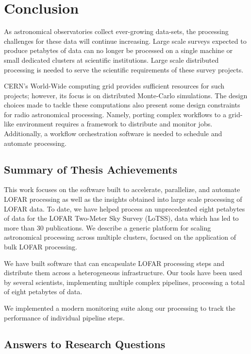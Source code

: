 \chapter{Conclusion}

\label{ch:conclusions}

As astronomical observatories collect ever-growing data-sets, the processing challenges for these data will continue increasing. Large scale surveys expected to produce petabytes of data can no longer be processed on a single machine or small dedicated clusters at scientific institutions. Large scale distributed processing is needed to serve the scientific requirements of these survey projects. 

CERN's World-Wide computing grid provides sufficient resources for such projects; however, its focus is on distributed Monte-Carlo simulations. The design choices made to tackle these computations also present some design constraints for radio astronomical processing. Namely, porting complex workflows to a grid-like environment requires a framework to distribute and monitor jobs. Additionally, a workflow orchestration software is needed to schedule and automate processing. 

\section{Summary of Thesis Achievements}

This work focuses on the software built to accelerate, parallelize, and automate LOFAR processing as well as the insights obtained into large scale processing of LOFAR data. To date, we have helped process an unprecedented eight petabytes of data for the LOFAR Two-Meter Sky Survey (LoTSS), data which has led to more than 30 publications. We describe a generic platform for scaling astronomical processing across multiple clusters, focused on the application of bulk LOFAR processing.  

We have built software that can encapsulate LOFAR processing steps and distribute them across a heterogeneous infrastructure. Our tools have been used by several scientists, implementing multiple complex pipelines, processing a total of eight petabytes of data. 

We implemented a modern monitoring suite along our processing to track the performance of individual pipeline steps. 

\section{Answers to Research Questions}


